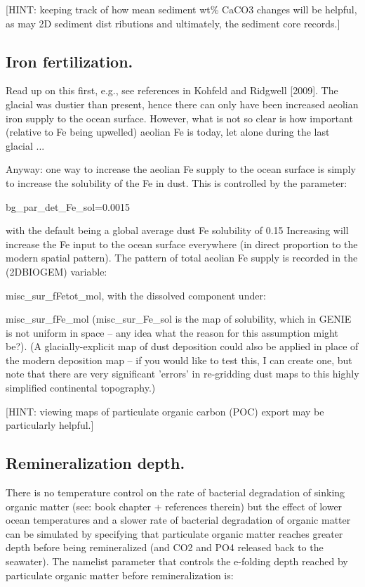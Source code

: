 \documentclass[11pt,fleqn]{book} %
\begin{document}
[HINT: keeping track of how mean sediment wt\% CaCO3 changes will be helpful, as may
2D sediment dist
ributions and ultimately, the sediment core records.]

%
\subsection{Iron fertilization.}

Read up on this first, e.g., see references in Kohfeld and Ridgwell [2009].
The glacial was dustier than present, hence there can only have been increased aeolian
iron supply to the ocean surface. However, what is not so clear is how important (relative to
Fe being upwelled) aeolian Fe is today, let alone during the last glacial ...

Anyway: one way to increase the aeolian Fe supply to the ocean surface is simply to
increase the solubility of the Fe in dust. This is controlled by the parameter:

bg\_par\_det\_Fe\_sol=0.0015

with the default being a global average dust Fe solubility of 0.15%
Increasing will increase the Fe input to the ocean surface everywhere (in direct proportion
to the modern spatial pattern). The pattern of total aeolian Fe supply is recorded in the (2DBIOGEM) variable:

misc\_sur\_fFetot\_mol, with the dissolved component under:

misc\_sur\_fFe\_mol (misc\_sur\_Fe\_sol is the map of solubility, which in GENIE is not
uniform in space -- any idea what the reason for this assumption might be?).
(A glacially-explicit map of dust deposition could also be applied in place of the modern
deposition map -- if you would like to test this, I can create one, but note that there are very
significant 'errors' in re-gridding dust maps to this highly simplified continental topography.)

[HINT: viewing maps of particulate organic carbon (POC) export may be particularly
helpful.]

%
\subsection{Remineralization depth.}

There is no temperature control on the rate of bacterial
degradation of sinking organic matter (see: book chapter + references therein) but the
effect of lower ocean temperatures and a slower rate of bacterial degradation of organic
matter can be simulated by specifying that particulate organic matter reaches greater depth
before being remineralized (and CO2 and PO4 released back to the seawater). The namelist
parameter that controls the e-folding depth reached by particulate organic matter before
remineralization is:
\end{document}
